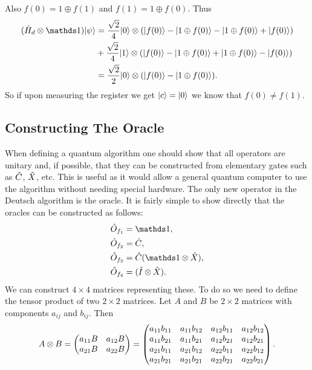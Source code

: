     Also \(f(0) = 1 \oplus f(1)\) and \(f(1) = 1 \oplus f(0)\).
    Thus
    \begin{align*}
        (\operator{H}_d\tensorProd\ident)\ket{\psi} &= \frac{\sqrt{2}}{4} \ket{0} \tensorProd (\ket{f(0)} - \ket{1 \oplus f(0)} - \ket{1\oplus f(0)} + \ket{f(0)})\\
        &+ \frac{\sqrt{2}}{4}\ket{1} \tensorProd (\ket{f(0)} - \ket{1\oplus f(0)} + \ket{1\oplus f(0)} - \ket{f(0)})\\
        &= \frac{\sqrt{2}}{2}\ket{0} \tensorProd (\ket{f(0)} - \ket{1 \oplus f(0)}).
    \end{align*}
    So if upon measuring the register we get \(\vert {c} \rangle = \vert {0} \rangle\) we know that \(f(0) \ne f(1)\).
    
    \subsection{Constructing The Oracle}
    When defining a quantum algorithm one should show that all operators are unitary and, if possible, that they can be constructed from elementary gates such as \(\hat{C}\), \(\hat{X}\), etc.
    This is useful as it would allow a general quantum computer to use the algorithm without needing special hardware.
    The only new operator in the Deutsch algorithm is the oracle.
    It is fairly simple to show directly that the oracles can be constructed as follows:
    \begin{align*}
        \operator{O}_{f_1} &= \ident,\\
        \operator{O}_{f_2} &= \operator{C},\\
        \operator{O}_{f_3} &= \operator{C} (\ident \tensorProd \operator{X}),\\
        \operator{O}_{f_4}&= (\operator{I}\tensorProd\operator{X}).
    \end{align*}
    We can construct \(4\times 4\) matrices representing these.
    To do so we need to define the tensor product of two \(2\times 2\) matrices.
    Let \(A\) and \(B\) be \(2\times 2\) matrices with components \(a_{ij}\) and \(b_{ij}\).
    Then
    \[
        A\otimes B = \begin{pmatrix} {a_{11}B} & {a_{12}B}\\ {a_{21}B} & {a_{22}B} \end{pmatrix} =
        \begin{pmatrix}
            a_{11}b_{11} & a_{11}b_{12} & a_{12}b_{11} & a_{12}b_{12}\\
            a_{11}b_{21} & a_{11}b_{21} & a_{12}b_{21} & a_{12}b_{21}\\
            a_{21}b_{11} & a_{21}b_{12} & a_{22}b_{11} & a_{22}b_{12}\\
            a_{21}b_{21} & a_{21}b_{21} & a_{22}b_{21} & a_{22}b_{21}
        \end{pmatrix}
        .
    \]
